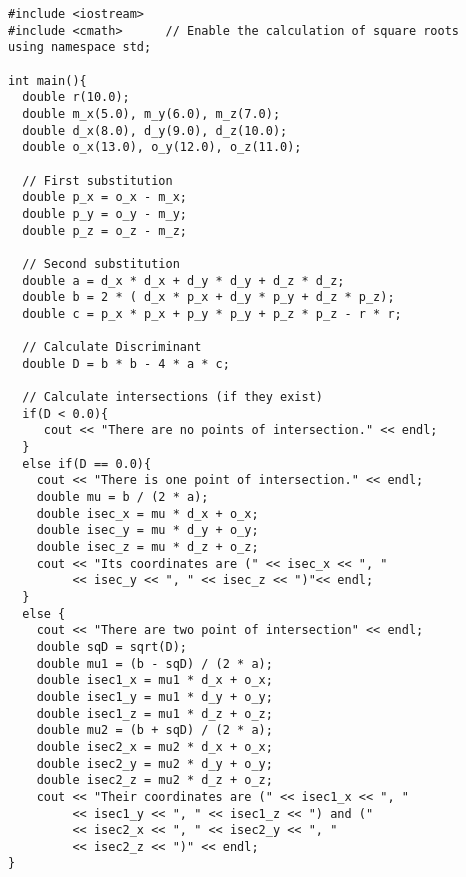 \documentclass[paper=A4, pagesize, DIV=calc, smallheadings,
fontsize=11pt, expansion=false]{scrreprt}
\begin{document}
\begin{verbatim}
#include <iostream>
#include <cmath>      // Enable the calculation of square roots
using namespace std;

int main(){
  double r(10.0);
  double m_x(5.0), m_y(6.0), m_z(7.0);
  double d_x(8.0), d_y(9.0), d_z(10.0);
  double o_x(13.0), o_y(12.0), o_z(11.0);

  // First substitution
  double p_x = o_x - m_x;
  double p_y = o_y - m_y;
  double p_z = o_z - m_z;

  // Second substitution
  double a = d_x * d_x + d_y * d_y + d_z * d_z;
  double b = 2 * ( d_x * p_x + d_y * p_y + d_z * p_z);
  double c = p_x * p_x + p_y * p_y + p_z * p_z - r * r;

  // Calculate Discriminant
  double D = b * b - 4 * a * c;

  // Calculate intersections (if they exist)
  if(D < 0.0){
     cout << "There are no points of intersection." << endl; 
  }
  else if(D == 0.0){
    cout << "There is one point of intersection." << endl;
    double mu = b / (2 * a);
    double isec_x = mu * d_x + o_x;
    double isec_y = mu * d_y + o_y;
    double isec_z = mu * d_z + o_z;
    cout << "Its coordinates are (" << isec_x << ", "
         << isec_y << ", " << isec_z << ")"<< endl;
  }
  else {
    cout << "There are two point of intersection" << endl;
    double sqD = sqrt(D);
    double mu1 = (b - sqD) / (2 * a);
    double isec1_x = mu1 * d_x + o_x;
    double isec1_y = mu1 * d_y + o_y;
    double isec1_z = mu1 * d_z + o_z;
    double mu2 = (b + sqD) / (2 * a);
    double isec2_x = mu2 * d_x + o_x;
    double isec2_y = mu2 * d_y + o_y;
    double isec2_z = mu2 * d_z + o_z;
    cout << "Their coordinates are (" << isec1_x << ", "
         << isec1_y << ", " << isec1_z << ") and ("
         << isec2_x << ", " << isec2_y << ", " 
         << isec2_z << ")" << endl;
}

\end{verbatim}
\begin{verbatim}
 

\end{verbatim}
\end{document}
